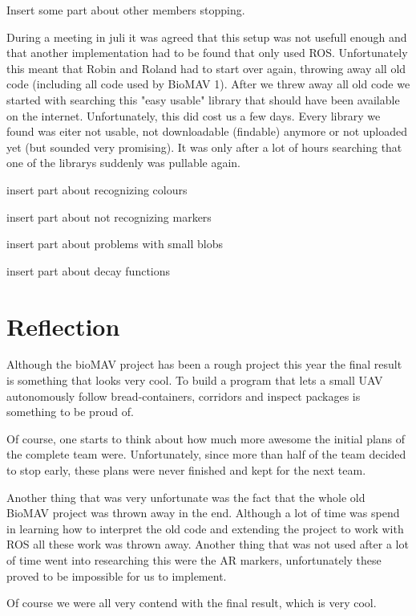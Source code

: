 \documentclass[a4paper,10pt]{article}
\begin{document}
Insert some part about other members stopping.

During a meeting in juli it was agreed that this setup was not usefull enough and that another implementation had to be found that only used ROS. 
Unfortunately this meant that Robin and Roland had to start over again, throwing away all old code (including all code used by BioMAV 1).  
After we threw away all old code we started with searching this "easy usable" library that should have been available on the internet. 
Unfortunately, this did cost us a few days. 
Every library we found was eiter not usable, not downloadable (findable) anymore or not uploaded yet (but sounded very promising). 
It was only after a lot of hours searching that one of the librarys suddenly was pullable again. 

insert part about recognizing colours

insert part about not recognizing markers

insert part about problems with small blobs

insert part about decay functions

\section{Reflection}

Although the bioMAV project has been a rough project this year the final result is something that looks very cool. 
To build a program that lets a small UAV autonomously follow bread-containers, corridors and inspect packages is something to be proud of. 

Of course, one starts to think about how much more awesome the initial plans of the complete team were. 
Unfortunately, since more than half of the team decided to stop early, these plans were never finished and kept for the next team. 

Another thing that was very unfortunate was the fact that the whole old BioMAV project was thrown away in the end. 
Although a lot of time was spend in learning how to interpret the old code and extending the project to work with ROS all these work was thrown away. 
Another thing that was not used after a lot of time went into researching this were the AR markers, unfortunately these proved to be impossible for us to implement. 

Of course we were all very contend with the final result, which is very cool. 




\end{document}
